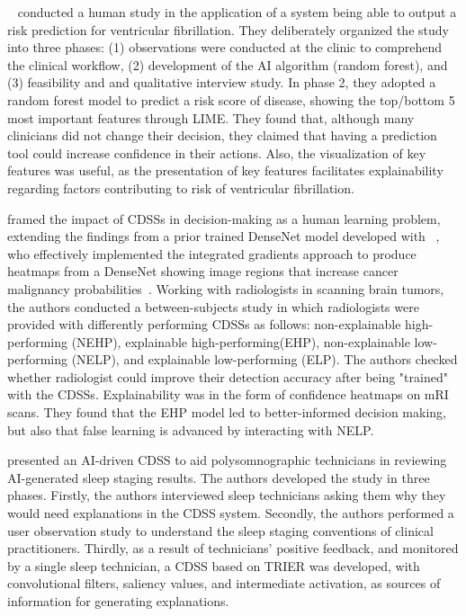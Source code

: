 ~\cite{matthiesen2021clinician} conducted a human study in the application of a system being able to output a risk prediction for ventricular fibrillation. They deliberately organized the study into three phases: (1) observations were conducted at the clinic to comprehend the clinical workflow, (2) development of the AI algorithm (random forest), and (3) feasibility and and qualitative interview study. In phase 2, they adopted a random forest model to predict a risk score of disease, showing the top/bottom 5 most important features through LIME. They found that, although many clinicians did not change their decision, they claimed that having a prediction tool could increase confidence in their actions. Also, the visualization of key features was useful, as the presentation of key features facilitates explainability regarding factors contributing to risk of ventricular fibrillation. 



 
\cite{ellenrieder2023promoting} framed the impact of CDSSs in decision-making as a human learning problem, extending the findings from a prior trained DenseNet model developed with ~\cite{pumplun2023bringing}, who effectively implemented the integrated gradients approach to produce heatmaps from a DenseNet showing image regions that increase cancer malignancy probabilities~\cite{sundararajan2017axiomatic}. 
Working with radiologists in scanning brain tumors, the authors conducted a between-subjects study in which radiologists were provided with differently performing CDSSs as follows: non-explainable high-performing (NEHP), explainable high-performing(EHP), non-explainable low-performing (NELP), and explainable low-performing (ELP). The authors checked whether radiologist could improve their detection accuracy after being "trained" with the CDSSs. Explainability was in the form of confidence heatmaps on mRI scans.  They found that the EHP model led to better-informed decision making, but also that false learning is advanced by interacting with NELP. 






\cite{hwang2022clinical} presented an AI-driven CDSS to aid polysomnographic technicians in reviewing AI-generated sleep staging results. The authors developed the study in three phases. Firstly, the authors interviewed sleep technicians asking them why they would need explanations in the CDSS system. Secondly, the authors performed a user observation study to understand the sleep staging conventions of clinical practitioners. Thirdly, as a result of technicians' positive feedback, and monitored by a single sleep technician, a CDSS based on TRIER was developed, with convolutional filters, saliency values, and intermediate activation, as sources of information for generating explanations. 



